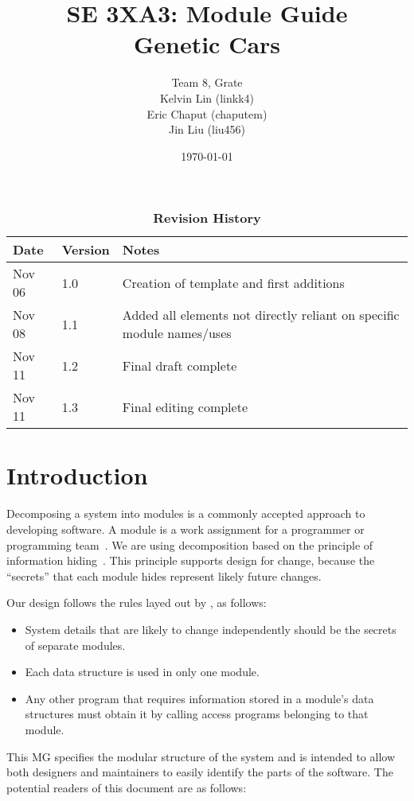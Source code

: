 \documentclass[12pt, titlepage]{article}
\title{SE 3XA3: Module Guide\\Genetic Cars}
\author{Team 8, Grate
		\\ Kelvin Lin (linkk4)
		\\ Eric Chaput (chaputem)
		\\ Jin Liu (liu456)
}
\date{\today}
\begin{document}
\maketitle

\tableofcontents
\listoftables
\listoffigures

\begin{table}[bp]
\caption{\bf Revision History}
\begin{tabularx}{\textwidth}{p{3cm}p{2cm}X}
\toprule {\bf Date} & {\bf Version} & {\bf Notes}\\
\midrule
Nov 06 & 1.0 & Creation of template and first additions\\
Nov 08 & 1.1 & Added all elements not directly reliant on specific module names/uses\\
Nov 11 & 1.2 & Final draft complete\\
Nov 11 & 1.3 & Final editing complete\\
\bottomrule
\end{tabularx}
\end{table}

\newpage


\section{Introduction}

Decomposing a system into modules is a commonly accepted approach to developing
software.  A module is a work assignment for a programmer or programming
team~\citep{ParnasEtAl1984}.  We are using decomposition
based on the principle of information hiding~\citep{Parnas1972a}.  This
principle supports design for change, because the ``secrets'' that each module
hides represent likely future changes.  

Our design follows the rules layed out by \citet{ParnasEtAl1984}, as follows:
\begin{itemize}
\item System details that are likely to change independently should be the
  secrets of separate modules.
\item Each data structure is used in only one module.
\item Any other program that requires information stored in a module's data
  structures must obtain it by calling access programs belonging to that module.
\end{itemize}

This MG specifies the modular structure of the system and is intended to allow both
designers and maintainers to easily identify the parts of the software.  The
potential readers of this document are as follows:
\end{document}
